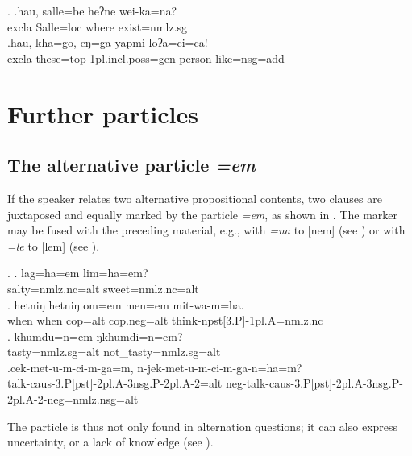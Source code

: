  \ex. \ag.hau,  salle=be        heʔne wei-ka=na?\\
 {\sc excla} Salle{\sc =loc} where exist{=nmlz.sg}\\
 \bg.hau,  kha=go, eŋ=ga  yapmi  loʔa=ci=ca!\\
 {\sc excla} these{\sc =top} {\sc 1pl.incl.poss=gen} person like{\sc =nsg=add}\\
 
\section{Further particles}\label{ptcl-further}
\subsection{The alternative particle \emph{=em}}\label{ptcl-alt}
\largerpage[-2]
If the speaker relates two alternative propositional contents, two clauses are juxtaposed and equally marked by the particle \emph{=em}, as shown in \Next. The marker may be fused with the preceding material, e.g., with  \emph{=na} to [nem] (see \Next[c]) or with \emph{=le} to [lem] (see \NNext[a]).
\largerpage

\ex. \ag. lag=ha=em lim=ha=em?\\
salty{\sc =nmlz.nc=alt} sweet{\sc =nmlz.nc=alt}\\
\bg. hetniŋ hetniŋ om=em men=em  mit-wa-m=ha.\\
when when	{\sc cop=alt} {\sc cop.neg=alt} think{\sc -npst[3.P]-1pl.A=nmlz.nc}\\
	\bg.   khumdu=n=em           ŋkhumdi=n=em?\\
tasty{\sc =nmlz.sg=alt} not\_tasty{\sc =nmlz.sg=alt}\\
	 
	\bg.cek-met-u-m-ci-m-ga=m,                                    n-jek-met-u-m-ci-m-ga-n=ha=m?\\
talk{\sc -caus-3.P[pst]-2pl.A-3nsg.P-2pl.A-2=alt}	{\sc neg-}talk{\sc -caus-3.P[pst]-2pl.A-3nsg.P-2pl.A-2-neg=nmlz.nsg=alt}\\
	 
 
 The  particle is thus not only found in alternation questions; it can also express uncertainty, or a lack of knowledge  (see \Next).
 
